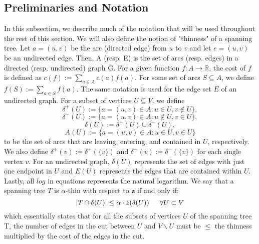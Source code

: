 \documentclass[oneside]{projectpaper} %
\begin{document}
\subsection{Preliminaries and Notation}
In this subsection, we describe much of the notation that will be used throughout the rest of this section. We will also define the notion of "thinness" of a spanning tree. \newline
\indent Let $a = (u, v)$ be the arc (directed edge) from $u$ to $v$ and let $e = (u, v)$ be an undirected edge. Then, A (resp. E) is the set of arcs (resp. edges) in a directed (resp. undirected) graph G. \newline
\indent For a given function $f : A \rightarrow \mathbb{R}$, the cost of $f$ is defined as $c(f) := \sum\limits_{a \in A}c(a)f(a)$. For some set of arcs $S \subseteq A$, we define $f(S) := \sum\limits_{a \in S}f(a)$. The same notation is used for the edge set $E$ of an undirected graph. \newline
\indent For a subset of vertices $U \subseteq V$, we define
\begin{equation*}
  \delta^{+}(U) := \{a = (u, v) \in A : u \in U, v \notin U\},
\end{equation*}
\begin{equation*}
  \delta^{-}(U) := \{a = (u, v) \in A : u \notin U, v \in U\},
\end{equation*}
\begin{equation*}
  \delta(U) := \delta^{+}(U) \cup \delta^{-}(U),
\end{equation*}
\begin{equation*}
  A(U) := \{a = (u, v) \in A : u \in U, v \in U\}
\end{equation*}
to be the set of arcs that are leaving, entering, and contained in $U$, respectively. We also define $\delta^{+}(v) :=\delta^{+}(\{v\})$ and $\delta^{-}(v) :=\delta^{-}(\{v\})$ for each single vertex $v$. For an undirected graph, $\delta(U)$ represents the set of edges with just one endpoint in $U$ and $E(U)$ represents the edges that are contained within $U$. Lastly, all $log$ in equations represents the natural logarithm. \newline
\indent We say that a spanning tree $T$ is $\alpha$-thin with respect to $\textbf{z}$  if and only if: 
\begin{equation*}
|T \cap \delta(U)| \leq \alpha \cdot z(\delta(U)) \indent \forall U \subset V
\end{equation*}
which essentially states that for all the subsets of vertices $U$ of the spanning tree T, the number of edges in the cut between $U$ and $V \backslash U$ must be $\leq$ the thinness multiplied by the cost of the edges in the cut. \newline
\end{document}
